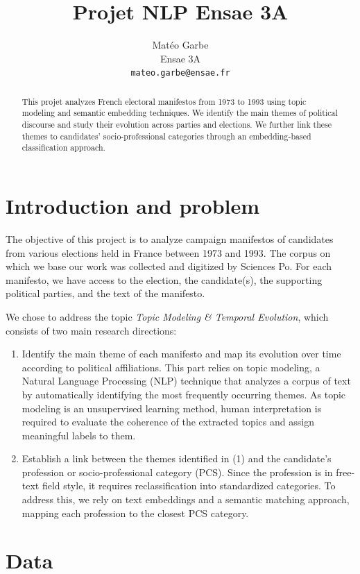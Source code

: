 \documentclass{article}
\title{Projet NLP Ensae 3A}
\author{
  Matéo Garbe \\
  Ensae 3A \\
  \texttt{mateo.garbe@ensae.fr} \\
}
\begin{document}
\maketitle

\begin{abstract}
    This projet analyzes French electoral manifestos from 1973 to 1993 using topic modeling and semantic embedding techniques. We identify the main themes of political discourse and study their evolution across parties and elections. We further link these themes to candidates’ socio-professional categories through an embedding-based classification approach. 
\end{abstract}

\section{Introduction and problem}

The objective of this project is to analyze campaign manifestos of candidates from various elections held in France between 1973 and 1993. The corpus on which we base our work was collected and digitized by Sciences Po. For each manifesto, we have access to the election, the candidate(s), the supporting political parties, and the text of the manifesto.

We chose to address the topic \textit{Topic Modeling \& Temporal Evolution}, which consists of two main research directions:
\begin{enumerate}
    \item Identify the main theme of each manifesto and map its evolution over time according to political affiliations. This part relies on topic modeling, a Natural Language Processing (NLP) technique that analyzes a corpus of text by automatically identifying the most frequently occurring themes. As topic modeling is an unsupervised learning method, human interpretation is required to evaluate the coherence of the extracted topics and assign meaningful labels to them.
    \item  Establish a link between the themes identified in (1) and the candidate's profession or socio-professional category (PCS). Since the profession is in free-text field style, it requires reclassification into standardized categories. To address this, we rely on text embeddings and a semantic matching approach, mapping each profession to the closest PCS category.
\end{enumerate}


\section{Data}
\end{document}
